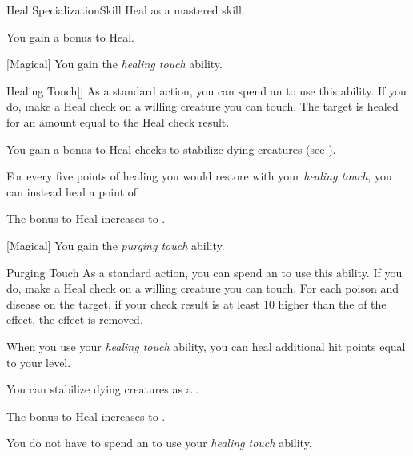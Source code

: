     \begin{feat}{Heal Specialization}{Skill}
        \featpre Heal as a mastered skill.

         You gain a  bonus to Heal.

        [Magical] You gain the \textit{healing touch} ability.
        \begin{ability}{Healing Touch}[]
            As a standard action, you can spend an  to use this ability.
            If you do, make a Heal check on a willing creature you can touch.
            The target is healed for an amount equal to the Heal check result.
        \end{ability}

         You gain a  bonus to Heal checks to stabilize dying creatures (see ).

         For every five points of healing you would restore with your \textit{healing touch}, you can instead heal a point of .

         The bonus to Heal increases to .

        [Magical] You gain the \textit{purging touch} ability.
        \begin{ability}{Purging Touch}
            As a standard action, you can spend an  to use this ability.
            If you do, make a Heal check on a willing creature you can touch.
            For each poison and disease on the target, if your check result is at least 10 higher than the  of the effect, the effect is removed.
        \end{ability}

         When you use your \textit{healing touch} ability, you can heal additional hit points equal to your level.

         You can stabilize dying creatures as a .

         The bonus to Heal increases to .

         You do not have to spend an  to use your \textit{healing touch} ability.
    \end{feat}

